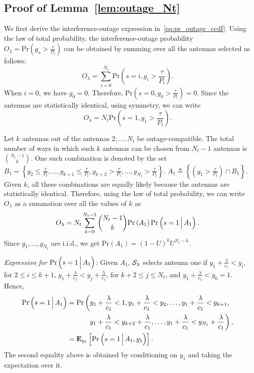 \documentclass[12pt,draftcls,peerreview,onecolumn]{IEEEtran}
\newcommand{\brac}[1]{\left({#1}\right)}
\newcommand{\define}{\triangleq}
\newcommand{\explow}[2]{{\bf{E}}_{#1}\left[{#2}\right]}
\newcommand{\prob}[1]{\text{Pr}\brac{#1}}
\newcommand{\Given}{\Big\arrowvert}
\newcommand{\nck}[2]{\binom{#1}{#2}}
\newcommand{\setB}{B_1}
\newcommand{\setAgt}{A_1}
\newcommand{\lam}{\lambda}
\newcommand{\Nt}{{N_t}}
\newcommand{\Pt}{{P_t}}
\newcommand{\puch}{g}
\newcommand{\gk}[1]{{\puch_{#1}}}
\newcommand{\itau}{\tau}
\newcommand{\cone}{c_{1}}
\newcommand{\out}{O}
\newcommand{\m}{\cone}
\newcommand{\taubypt}{\frac{\itau}{\Pt}}
\newcommand{\gkgrtaubypt}[1]{{\gk{#1}}>\taubypt}
\newcommand{\gklttaubypt}[1]{{\gk{#1}}\leq\taubypt}
\newcommand{\lambym}{\frac{\lam}{\m}}
\newcommand{\yk}[1]{y_{#1}}
\newcommand{\ykplambym}[1]{\yk{#1}+\lambym}
\newcommand{\un}{U}
\newcommand{\callamrule}{{\cal S_{{\lam}}}}
\newcommand{\outlam}{\out_{\lam}}
\begin{document}
\subsection{Proof of Lemma~\ref{lem:outage_Nt}}
\label{proof:outage_Nt}
We first derive the interference-outage expression in~\eqref{eq:pr_outage_ccdf}. 
Using the law of total probability, the interference-outage probability $\outlam=\prob{\gkgrtaubypt{s}}$ can be obtained by summing over all the antennas selected as follows:
%
\begin{equation}
\outlam= \sum_{i=0}^{\Nt}\prob{s=i,\gk{i}>\taubypt}.
\label{eq:out_1}
\end{equation}
%
When $i=0$, we have $\gk{0}=0$. Therefore, $\prob{s=0,\gk{0}>\taubypt}=0$.  
%
Since the antennas are statistically identical, using symmetry, we can write
%
\begin{equation}
\outlam=\Nt\text{Pr}\brac{s=1,\gk{1}>\taubypt}.
\label{eq:out_2}
\end{equation}
%

Let $k$ antennas out of the antennas $2,\ldots,\Nt$ be outage-compatible. The total number of ways in which such $k$ antennas can be chosen from $\Nt-1$ antennas is $\nck{\Nt-1}{k}$. One such combination is denoted by the set $\setB=\left\{\gklttaubypt{2},\dots,\gklttaubypt{k+1},\gkgrtaubypt{k+2},\dots,\gkgrtaubypt{\Nt}\right\}$. $\setAgt\define\left\{\left(\gkgrtaubypt{1}\right)\cap\setB \right\}$. Given $k$, all these combinations are equally likely because the antennas are statistically identical. Therefore, using the law of total probability, we can write $\outlam$ as a summation over all the values of $k$ as
%
\begin{equation}
\outlam =\Nt\sum_{k=0}^{\Nt-1}\nck{\Nt-1}{k} \text{Pr}\brac{\setAgt} \text{Pr}\brac{s = 1\Given \setAgt}. 
\label{eq:out_3}
\end{equation}
%
Since $\gk{1},\ldots,\gk{\Nt}$ are i.i.d., we get $\prob{\setAgt} = \left(1-\un\right)^k\un^{\Nt-k}$.
%

{\em Expression for $\prob{s = 1\Given\setAgt}$:} Given $\setAgt$, $\callamrule$ selects antenna one if $\ykplambym{1}<\yk{i}$, for $2\leq i \leq k+1$,  $\ykplambym{1}<\ykplambym{j}$, for $k+2\leq j \leq \Nt$, and $\ykplambym{1}<\yk{0}=1$. Hence,
%
\begin{align}
\label{eq:out_5}
\prob{s = 1\Given \setAgt }&=\text{Pr}\left(\ykplambym{1} < 1, \ykplambym{1}<\yk{2}, \dots ,\ykplambym{1}<\yk{k+1},\right.\nonumber\\
&\quad\quad\quad\left.
\ykplambym{1}<\ykplambym{k+2}, \dots ,\ykplambym{1}<\ykplambym{\Nt}\right),  \\
&=\explow{\yk{1}}{\prob{s = 1\Given\setAgt,\yk{1}}}.
\end{align} 
%
The second equality above is obtained by conditioning on $\yk{1}$ and taking the expectation over it. 
\end{document}
